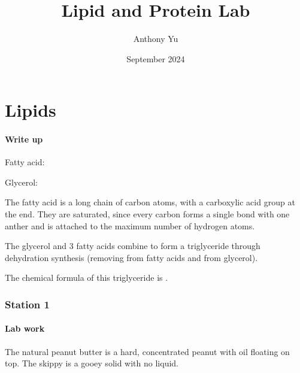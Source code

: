 \documentclass[12pt]{article}
\title{Lipid and Protein Lab}
\author{Anthony Yu}
\date{September 2024}
\begin{document}
\newcommand{\problem}[1]{\subsection*{Problem {#1}}}
\newenvironment{enumAlph}{\begin{enumerate}[label=(\alph*)]}{\end{enumerate}}

\makeatletter
\newcommand{\skipitems}[1]{%
\addtocounter{\@enumctr}{#1}%
}
\makeatother

\usetikzlibrary{decorations.pathmorphing}

\newcommand{\chunit}[3]{\qty{#1}{{#2}\,\ce{#3}}}
\newcommand{\chuniteval}[3]{\qty[evaluate-expression]{#1}{{#2}\,\ce{#3}}}

\maketitle

\part*{Lipids}

\subsection*{Write up}
Fatty acid:  

Glycerol:  

The fatty acid is a long chain of carbon atoms, with a carboxylic acid group at the end.
They are saturated, since every carbon forms a single bond with one anther and is attached
to the maximum number of hydrogen atoms. 

The glycerol and 3 fatty acids combine to form a triglyceride through dehydration synthesis 
(removing  from fatty acids and  from glycerol). 

The chemical formula of this triglyceride is .


\section*{Station 1}
\subsection*{Lab work}
The natural peanut butter is a hard, concentrated peanut with oil floating on top. 
The skippy is a gooey solid with no liquid. 
\end{document}
